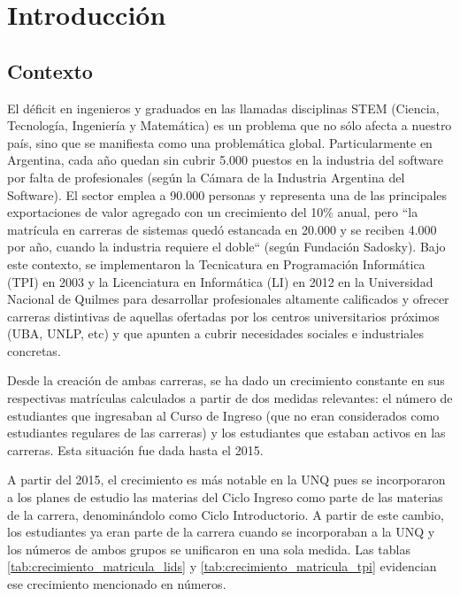 \chapter{Introducción}
\label{sec:introduccion}

\section[Contexto]{Contexto}
El déficit en ingenieros y graduados en las llamadas disciplinas STEM (Ciencia, Tecnología, Ingeniería y Matemática) es un problema que no sólo afecta a nuestro país, sino que se manifiesta como una problemática global. Particularmente en Argentina, cada año quedan sin cubrir 5.000 puestos en la industria del software por falta de profesionales (según la Cámara de la Industria Argentina del Software). El sector emplea a 90.000 personas y representa una de las principales exportaciones de valor agregado con un crecimiento del 10\% anual, pero “la matrícula en carreras de sistemas quedó estancada en 20.000 y se reciben 4.000 por año, cuando la industria requiere el doble“ (según Fundación Sadosky).
Bajo este contexto, se implementaron la Tecnicatura en Programación Informática (TPI) en 2003 y la Licenciatura en Informática (LI) en 2012 en la Universidad Nacional de Quilmes para desarrollar profesionales altamente calificados y ofrecer carreras distintivas de aquellas ofertadas por los centros universitarios próximos (UBA, UNLP, etc) y que apunten a cubrir necesidades sociales e industriales concretas.
 
Desde la creación de ambas carreras, se ha dado un crecimiento constante  en sus respectivas matrículas calculados a partir de dos medidas relevantes: el número de estudiantes que ingresaban al Curso de Ingreso (que no eran considerados como estudiantes regulares de las carreras) y los estudiantes que estaban activos en las carreras. Esta situación fue dada hasta el 2015. 

A partir del 2015, el crecimiento es más notable en la UNQ pues se incorporaron a los planes de estudio las materias del Ciclo Ingreso como parte de las materias de la carrera, denominándolo como Ciclo Introductorio. A partir de este cambio, los estudiantes ya eran parte de la carrera cuando se incorporaban a la UNQ y los números de ambos grupos se unificaron en una sola medida. Las tablas \ref{tab:crecimiento_matricula_lids} y \ref{tab:crecimiento_matricula_tpi} evidencian ese crecimiento mencionado en números.


